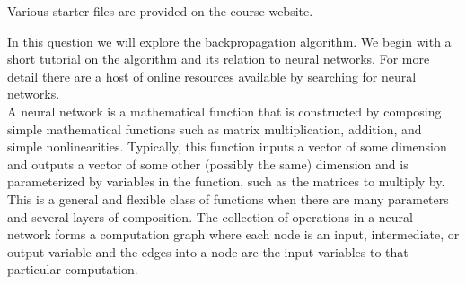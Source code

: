 \documentclass{article}
\begin{document}
Various starter files are provided on the course website.  








In this question we will explore the backpropagation algorithm.
We begin with a short tutorial on the algorithm and its relation to neural networks.
For more detail there are a host of online resources available by searching for neural networks.
\\


A neural network is a mathematical function that is constructed by composing simple mathematical functions such as matrix multiplication, addition, and simple nonlinearities.
Typically, this function inputs a vector of some dimension and outputs a vector of some other (possibly the same) dimension and is parameterized by variables in the function, such as the matrices to multiply by.
This is a general and flexible class of functions when there are many parameters and several layers of composition.
The collection of operations in a neural network forms a computation graph where each node is an input, intermediate, or output variable and the edges into a node are the input variables to that particular computation.
\\
\end{document}
